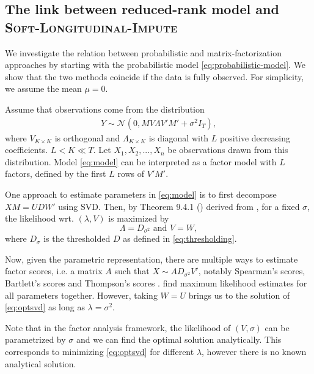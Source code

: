 \documentclass[preprint]{imsart}
\numberwithin{equation}{section}
\theoremstyle{plain}
\newcommand{\cN}{\mathcal{N}}
\newcommand{\R}{\mathbb{R}}
\begin{document}
\subsection{The link between reduced-rank model and \textsc{Soft-Longitudinal-Impute}}\label{s:the-link}

We investigate the relation between probabilistic and matrix-factorization approaches by starting with the probabilistic model \eqref{eq:probabilistic-model}. We show that the two methods coincide if the data is fully observed. For simplicity, we assume the mean $\mu = 0$. 

Assume that observations come from the distribution
\begin{align}\label{eq:model}
  Y \sim \cN(0, M V \Lambda V'  M' + \sigma^2 I_T),
\end{align}
where $V_{K \times K}$ is orthogonal and $\Lambda_{K \times K}$ is diagonal with $L$ positive decreasing coefficients.
$L < K \ll T$. Let $X_1,X_2,...,X_n$ be observations drawn from this distribution. Model \eqref{eq:model} can be interpreted as a factor model with $L$ factors, defined by the first $L$ rows of $V'M'$.

One approach to estimate parameters in \eqref{eq:model} is to first decompose $XM = U D W'$ using SVD. Then, by Theorem 9.4.1 (\citet{mardia1980multivariate}) derived from \citep{joreskog1967some}, for a fixed $\sigma$, the likelihood wrt. $(\lambda,V)$ is maximized by
\[
 \Lambda = D_{\sigma^2} \text{ and } V = W,
\]
where $D_\sigma$ is the thresholded $D$ as defined in \eqref{eq:thresholding}.

Now, given the parametric representation, there are multiple ways to estimate factor scores, i.e. a matrix $A$ such that $X \sim AD_{\sigma^2}V'$, notably Spearman's scores, Bartlett's scores and Thompson's scores \citep{kim1978factor}. \citet{james2000principal} find maximum likelihood estimates for all parameters together. However, taking $W = U$ brings us to the solution of \eqref{eq:optsvd} as long as $\lambda = \sigma^2$.

Note that in the factor analysis framework, the likelihood of $(V,\sigma)$ can be parametrized by $\sigma$ and we can find the optimal solution analytically. This corresponds to minimizing \eqref{eq:optsvd} for different $\lambda$, however there is no known analytical solution.
\end{document}
